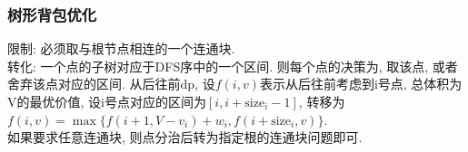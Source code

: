 \subsubsection{树形背包优化}
\noindent
限制: 必须取与根节点相连的一个连通块.\\
转化: 一个点的子树对应于DFS序中的一个区间. 则每个点的决策为, 取该点, 或者舍弃该点对应的区间. 从后往前dp, 设$f(i, v)$表示从后往前考虑到i号点, 总体积为V的最优价值, 设i号点对应的区间为$[i,i+\mathrm{size}_i-1]$, 转移为$f(i, v)=\max\{f(i+1, V-v_i)+w_i, f(i+\mathrm{size}_i, v)\}$.\\
如果要求任意连通块, 则点分治后转为指定根的连通块问题即可.
